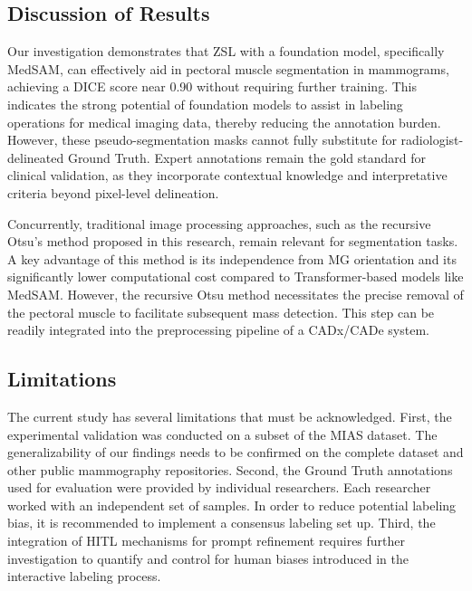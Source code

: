 \documentclass[runningheads]{llncs}
\begin{document}
\subsection{Discussion of Results}
Our investigation demonstrates that \ac{ZSL} with a foundation model,
specifically \ac{MedSAM}, can effectively aid in pectoral muscle
segmentation in mammograms, achieving a \ac{DICE} score near 0.90
without requiring further training. This indicates the strong
potential of foundation models to assist in labeling operations for
medical imaging data, thereby reducing the annotation burden. However,
these pseudo-segmentation masks cannot fully substitute for
radiologist-delineated Ground Truth. Expert annotations remain the
gold standard for clinical validation, as they incorporate contextual
knowledge and interpretative criteria beyond pixel-level delineation.

Concurrently, traditional image processing approaches, such as the
recursive Otsu's method proposed in this research, remain relevant for
segmentation tasks. A key advantage of this method is its independence
from \ac{MG} orientation and its significantly lower computational
cost compared to Transformer-based models like \ac{MedSAM}. However,
the recursive Otsu method necessitates the precise removal of the
pectoral muscle to facilitate subsequent mass detection. This step can
be readily integrated into the preprocessing pipeline of a
\ac{CADx}/\ac{CADe} system.


\subsection{Limitations}
The current study has several limitations that must be
acknowledged. First, the experimental validation was conducted on a
subset of the \ac{MIAS} dataset. The generalizability of our findings
needs to be confirmed on the complete dataset and other public
mammography repositories. Second, the Ground Truth annotations used
for evaluation were provided by individual researchers. Each
researcher worked with an independent set of samples. In order to
reduce potential labeling bias, it is recommended to implement a
consensus labeling set up. Third, the integration of \ac{HITL}
mechanisms for prompt refinement requires further investigation to
quantify and control for human biases introduced in the interactive
labeling process.
\end{document}
